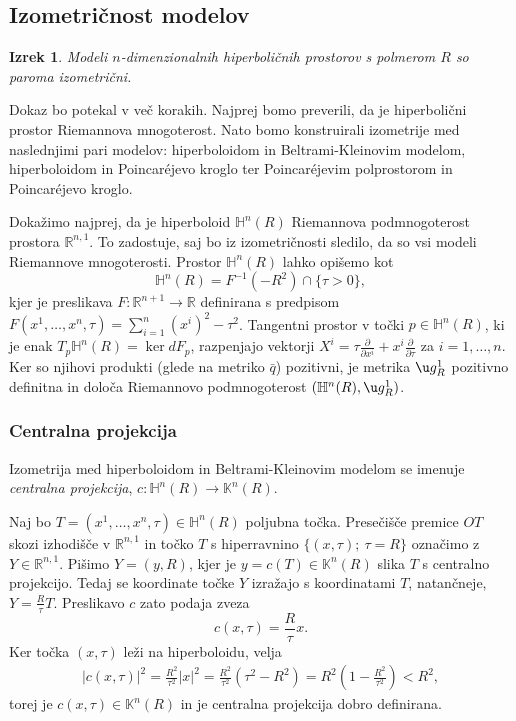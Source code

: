 \documentclass[a4paper]{article}
\newtheorem{izrek}{Izrek}
\begin{document}
\subsection{Izometričnost modelov}

\begin{izrek}
Modeli $n$-dimenzionalnih hiperboličnih prostorov s polmerom $R$ so paroma izometrični.
\end{izrek}

Dokaz bo potekal v več korakih. Najprej bomo preverili, da je hiperbolični prostor Riemannova mnogoterost. Nato bomo konstruirali izometrije med naslednjimi pari modelov: hiperboloidom in Beltrami-Kleinovim modelom, hiperboloidom in Poincar\'ejevo kroglo ter Poincar\'ejevim polprostorom in Poincar\'ejevo kroglo.

Dokažimo najprej, da je hiperboloid $\mathbb{H}^{n}(R)$ Riemannova podmnogoterost prostora $\mathbb{R}^{n,1}$. To zadostuje, saj bo iz izometričnosti sledilo, da so vsi modeli Riemannove mnogoterosti.
Prostor $\mathbb{H}^{n}(R)$ lahko opišemo kot 
\begin{equation}\label{eq:H^n enacba}
\mathbb{H}^{n}(R) = F^{-1}(-R^2) \cap \{ \tau>0 \},
\end{equation}
kjer je preslikava $F \colon \mathbb{R}^{n+1} \to \mathbb{R}$ definirana s predpisom $F(x^{1}, \dots , x^{n}, \tau) = \sum_{i=1}^{n} (x^{i})^2 - \tau^2$.
Tangentni prostor v točki $p \in \mathbb{H}^{n}(R)$, ki je enak $T_{p}\mathbb{H}^{n}(R) = \ker dF_{p}$, razpenjajo vektorji $X^{i} = \tau \frac{\partial}{\partial x^{i}} + x^{i} \frac{\partial}{\partial \tau}$ za $i = 1, \dots , n$. Ker so njihovi produkti (glede na metriko $\bar{q}$) pozitivni, je metrika $\u g_{R}^{1}$ pozitivno definitna in določa Riemannovo podmnogoterost $(\mathbb{H}^{n}(R), \u g_{R}^{1})$. 

\subsubsection{Centralna projekcija}
Izometrija med hiperboloidom in Beltrami-Kleinovim modelom se imenuje \emph{centralna projekcija}, $c \colon \mathbb{H}^{n}(R) \to \mathbb{K}^{n}(R)$.

Naj bo $T=(x^{1}, \dots , x^{n}, \tau) \in \mathbb{H}^{n}(R)$ poljubna točka. Presečišče premice $OT$ skozi izhodišče v $\mathbb{R}^{n,1}$ in točko $T$ s hiperravnino $\{ (x, \tau); \ \tau=R \}$ označimo z $Y \in \mathbb{R}^{n,1}$. Pišimo $Y=(y,R)$, kjer je $y = c(T) \in \mathbb{K}^{n}(R)$ slika $T$ s centralno projekcijo. 
Tedaj se koordinate točke $Y$ izražajo s koordinatami $T$, natančneje, $Y=\frac{R}{\tau} T$. Preslikavo $c$ zato podaja zveza
\begin{equation}\label{eq: cent-proj}
c(x, \tau) = \frac{R}{\tau} x.
\end{equation}
Ker točka $(x,\tau)$ leži na hiperboloidu, velja
\begin{gather*}
|c(x,\tau)|^2 = \frac{R^2}{\tau^2} |x|^2 = \frac{R^2}{\tau^2}(\tau^2-R^2) = R^2 \left(1-\frac{R^2}{\tau^2} \right) < R^2,
\end{gather*}
torej je $c(x, \tau) \in \mathbb{K}^{n}(R)$ in je centralna projekcija dobro definirana.
\end{document}
